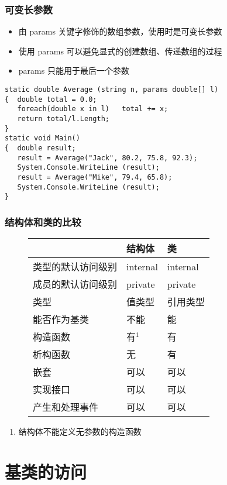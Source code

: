 \begin{frame}[fragile]
\frametitle{可变长参数}
\begin{itemize}
\item 由 params 关键字修饰的数组参数，使用时是可变长参数
\item 使用 params 可以避免显式的创建数组、传递数组的过程
\item params 只能用于最后一个参数
\end{itemize}
\begin{lstlisting}
static double Average (string n, params double[] l)
{  double total = 0.0;
   foreach(double x in l)   total += x;
   return total/l.Length;
}
static void Main()
{  double result;
   result = Average("Jack", 80.2, 75.8, 92.3);
   System.Console.WriteLine (result);
   result = Average("Mike", 79.4, 65.8);
   System.Console.WriteLine (result);
}
\end{lstlisting}
\end{frame}

\begin{frame}
\frametitle{结构体和类的比较}
\begin{figure}
  \centering
  \begin{tabular}{l|l|l}
    \hline
                       & 结构体   & 类       \\
    \hline
    类型的默认访问级别 & internal & internal \\
    成员的默认访问级别 & private  & private  \\
    类型               & 值类型   & 引用类型 \\
    能否作为基类       & 不能     & 能       \\
    构造函数           & 有$^{1}$ & 有       \\
    析构函数           & 无       & 有       \\
    嵌套               & 可以     & 可以     \\
    实现接口           & 可以     & 可以     \\
    产生和处理事件     & 可以     & 可以     \\
    \hline
  \end{tabular}
\end{figure}
\begin{enumerate}
\item 结构体不能定义无参数的构造函数
\end{enumerate}

\end{frame}

\section{基类的访问}

